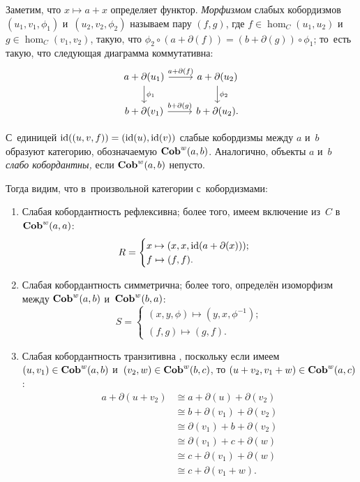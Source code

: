 \documentclass[a4paper,oneside]{article}
\begin{document}
Заметим, что $x \mapsto a + x$ определяет функтор. \textit{Морфизмом} слабых кобордизмов $(u_1, v_1, \phi_1)$
и~$(u_2, v_2, \phi_2)$ называем пару $(f, g)$, где $f \in \hom_C(u_1, u_2)$ и~$g \in \hom_C(v_1, v_2)$,
такую, что $\phi_2 \circ (a + \partial(f)) = (b + \partial(g)) \circ \phi_1$; то~есть такую, что следующая
диаграмма коммутативна:
\[
  \begin{tikzcd}
    \arrow{d}{\phi_1} a + \partial(u_1) \arrow{r}{a + \partial(f)} & a + \partial(u_2) \arrow{d}{\phi_2} \\
                      b + \partial(v_1) \arrow{r}{b + \partial(g)} & b + \partial(u_2).
  \end{tikzcd}
\]

С~единицей $\mathrm{id}((u, v, f)) = (\mathrm{id}(u), \mathrm{id}(v))$ слабые кобордизмы между $a$ и~$b$ образуют категорию, обозначаемую $\mathbf{Cob}^w(a, b)$.
Аналогично, объекты $a$ и~$b$ \textit{слабо кобордантны,} если $\mathbf{Cob}^w(a, b)$ непусто.

Тогда видим, что в~произвольной категории с~кобордизмами:
\begin{enumerate}
    \item Слабая кобордантность рефлексивна; более того, имеем включение из~$C$ в~$\mathbf{Cob}^w(a, a)$:
    $$
        R = \begin{cases}
            x \mapsto (x, x, \mathrm{id}(a + \partial(x))); \\
            f \mapsto (f, f).
        \end{cases}
    $$
    \item Слабая кобордантность симметрична; более того, определён изоморфизм между $\mathbf{Cob}^w(a, b)$ и~$\mathbf{Cob}^w(b, a)$:
    $$
        S = \begin{cases}
            (x, y, \phi) \mapsto (y, x, \phi^{-1}); \\
            (f, g) \mapsto (g, f).
        \end{cases}
    $$
    \item Слабая кобордантность транзитивна \cite{Weston}, поскольку если имеем $(u, v_1) \in \mathbf{Cob}^w(a, b)$ и~$(v_2, w) \in \mathbf{Cob}^w(b, c)$,
    то $(u + v_2, v_1 + w) \in \mathbf{Cob}^w(a, c)$:
    \begin{align*}
        a + \partial(u + v_2) & \cong a + \partial(u) + \partial(v_2) \\
                              & \cong b + \partial(v_1) + \partial(v_2) \\
                              & \cong \partial(v_1) + b + \partial(v_2) \\
                              & \cong \partial(v_1) + c + \partial(w) \\
                              & \cong c + \partial(v_1) + \partial(w) \\
                              & \cong c + \partial(v_1 + w).
    \end{align*}
\end{enumerate}
\end{document}
